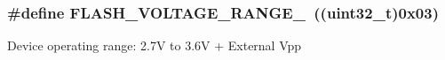 \subsubsection[{\texorpdfstring{F\+L\+A\+S\+H\+\_\+\+V\+O\+L\+T\+A\+G\+E\+\_\+\+R\+A\+N\+G\+E\+\_\+4}{FLASH_VOLTAGE_RANGE_4}}]{\setlength{\rightskip}{0pt plus 5cm}\#define F\+L\+A\+S\+H\+\_\+\+V\+O\+L\+T\+A\+G\+E\+\_\+\+R\+A\+N\+G\+E\+\_~((uint32\+\_\+t)0x03)}\hypertarget{group___f_l_a_s_h_ex___voltage___range_gabf8037a482f18815c5a67f287223a658}{}\label{group___f_l_a_s_h_ex___voltage___range_gabf8037a482f18815c5a67f287223a658}
Device operating range\+: 2.\+7V to 3.\+6V + External Vpp 